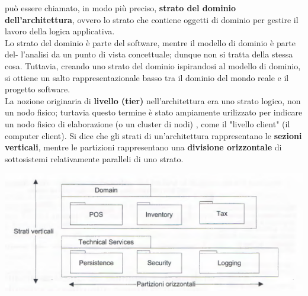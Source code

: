 \documentclass[a4paper,12pt, oneside]{book}
\begin{document}
può essere chiamato, in modo più preciso, \textbf{strato del dominio dell'architettura}, ovvero
lo strato che contiene oggetti di dominio per gestire il lavoro della logica applicativa.\\
Lo strato del dominio è parte del software, mentre il modello di dominio è parte del-
l'analisi da un punto di vista concettuale; dunque non si tratta della stessa cosa. Tuttavia,
creando uno strato del dominio ispirandosi al modello di dominio, si ottiene un salto
rappresentazionale basso tra il dominio del mondo reale e il progetto software.\\
La nozione originaria di \textbf{livello (tier)} nell'architettura era uno strato logico, non un
nodo fisico; turtavia questo termine è stato ampiamente urilizzato per indicare un nodo
fisico di elaborazione (o un cluster di nodi) , come il "livello client" (il computer client). Si dice che gli strati di un'architettura rappresentano le \textbf{sezioni verticali},
mentre le partizioni rappresentano una \textbf{divisione orizzontale} di sottosistemi relativamente paralleli di
uno strato.
\begin{center}
\includegraphics[scale =0.7]{img/log5.png}
\end{center}
\end{document}
